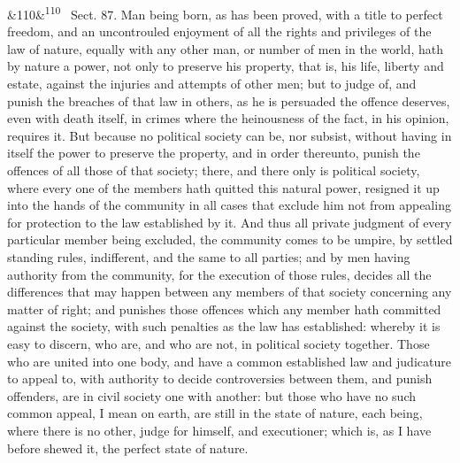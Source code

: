 \documentclass[12pt]{article}
\newcommand{\para}[1][]{\par\noindent\ifx&#1&\else\textsuperscript{\footnotesize #1}~\fi}
\begin{document}
\para[110] Sect. 87. Man being born, as has been proved, with a title to perfect freedom, and an uncontrouled enjoyment of all the rights and privileges of the law of nature, equally with any other man, or number of men in the world, hath by nature a power, not only to preserve his property, that is, his life, liberty and estate, against the injuries and attempts of other men; but to judge of, and punish the breaches of that law in others, as he is persuaded the offence deserves, even with death itself, in crimes where the heinousness of the fact, in his opinion, requires it. But because no political society can be, nor subsist, without having in itself the power to preserve the property, and in order thereunto, punish the offences of all those of that society; there, and there only is political society, where every one of the members hath quitted this natural power, resigned it up into the hands of the community in all cases that exclude him not from appealing for protection to the law established by it. And thus all private judgment of every particular member being excluded, the community comes to be umpire, by settled standing rules, indifferent, and the same to all parties; and by men having authority from the community, for the execution of those rules, decides all the differences that may happen between any members of that society concerning any matter of right; and punishes those offences which any member hath committed against the society, with such penalties as the law has established: whereby it is easy to discern, who are, and who are not, in political society together. Those who are united into one body, and have a common established law and judicature to appeal to, with authority to decide controversies between them, and punish offenders, are in civil society one with another: but those who have no such common appeal, I mean on earth, are still in the state of nature, each being, where there is no other, judge for himself, and executioner; which is, as I have before shewed it, the perfect state of nature.
\end{document}
